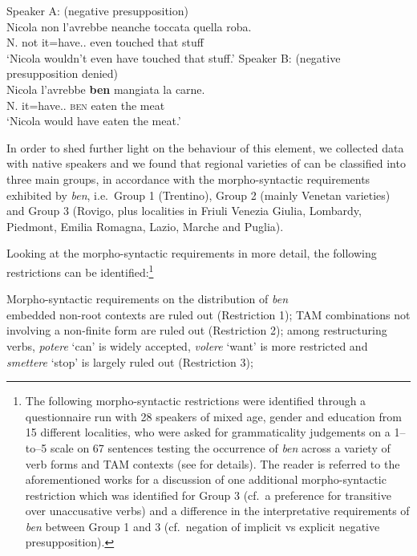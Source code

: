 \documentclass[output=paper]{langsci/langscibook}
\begin{document}
\ea {}
	\ea Speaker A: (negative presupposition)\\
        \sn
		\gll    Nicola non l’avrebbe neanche toccata quella roba.\\
			    N. not it=have.\Cond{}.\Tsg{} even touched that stuff\\
        \glt    \enquote*{Nicola wouldn’t even have touched that stuff.}
	\ex Speaker B: (negative presupposition denied)\\
        \sn
		\gll    Nicola l’avrebbe \textbf{ben} mangiata la carne.\\
			    N. it=have.\Cond{}.\Tsg{} \textsc{ben} eaten the meat\\
        \glt    \enquote*{Nicola would have eaten the meat.}
	\z
\z

In order to shed further light on the behaviour of this element, we collected
data with native speakers and we found that regional varieties of  can
be classified into three main groups, in accordance with the morpho-syntactic
requirements exhibited by \emph{ben}, i.e.\ Group 1 (Trentino), Group 2 (mainly
Venetan varieties) and Group 3 (Rovigo, plus localities in Friuli Venezia
Giulia, Lombardy, Piedmont, Emilia Romagna, Lazio, Marche and Puglia).

Looking at the morpho-syntactic requirements in more detail, the following
restrictions can be identified:\footnote{The following morpho-syntactic
    restrictions were identified through a questionnaire run with 28 speakers
    of mixed age, gender and education from 15 different localities, who were
    asked for grammaticality judgements on a 1--to--5 scale on 67 sentences
    testing the occurrence of \emph{ben} across a variety of verb forms and
    \gls{TAM} contexts (see \citealt{CognSchi2018b,CognSchi2018} for details).
    The reader is referred to the aforementioned works for a discussion of one
    additional morpho-syntactic restriction which was identified for Group 3
    (cf.\ a preference for transitive over unaccusative verbs) and a difference
    in the interpretative requirements of \emph{ben} between Group 1 and 3
    (cf.\ negation of implicit vs explicit negative presupposition).}

\ea\label{ex:key:12.3} Morpho-syntactic requirements on the distribution of
        \emph{ben}\\
	\ea embedded non-root contexts are ruled out (Restriction 1);
    \ex \gls{TAM} combinations not involving a non-finite form are ruled out
        (Restriction 2);
    \ex among restructuring verbs, \emph{potere} ‘can’ is widely accepted,
        \emph{volere} ‘want’ is more restricted and
        \emph{smettere} ‘stop’ is largely ruled out (Restriction 3);
	\z
\z
\end{document}

